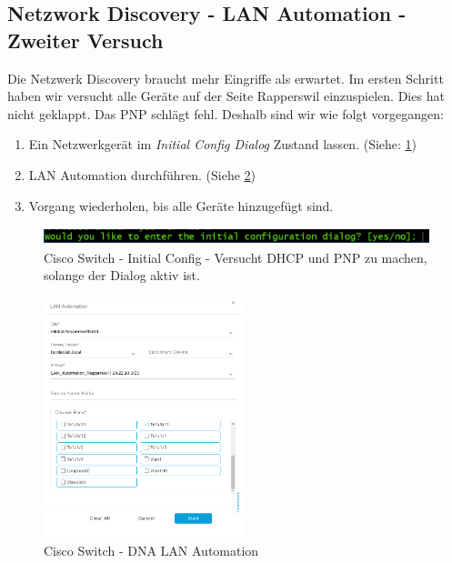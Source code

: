 \subsection{Netzwork Discovery - LAN Automation - Zweiter Versuch}
\label{Netzwork Discovery - LAN Automation - Zweiter Versuch}
Die Netzwerk Discovery braucht mehr Eingriffe als erwartet. Im ersten Schritt haben wir versucht alle Geräte auf der Seite Rapperswil einzuspielen. Dies hat nicht geklappt. Das PNP schlägt fehl. Deshalb sind wir wie folgt vorgegangen:
\begin{enumerate}
	\item Ein Netzwerkgerät im \textit{Initial Config Dialog} Zustand lassen. (Siehe: \ref{fig:cisco-switch-initial-config})
	\item LAN Automation durchführen. (Siehe \ref{fig:dna-lan-automation-dialog})
	\item Vorgang wiederholen, bis alle Geräte hinzugefügt sind. 
\end{enumerate}

\begin{figure}[H]
	\centering
	\includegraphics[height=0.5cm]{img/secondtry/cisco-switch-initial-config.png}
	\caption{Cisco Switch - Initial Config - Versucht DHCP und PNP zu machen, solange der Dialog aktiv ist.}
	\label{fig:cisco-switch-initial-config}
\end{figure}

\begin{figure}[H]
	\centering
	\includegraphics[height=7cm]{img/secondtry/dna-lan-automation-dialog.png}
	\caption{Cisco Switch - DNA LAN Automation}
	\label{fig:dna-lan-automation-dialog}
\end{figure}


